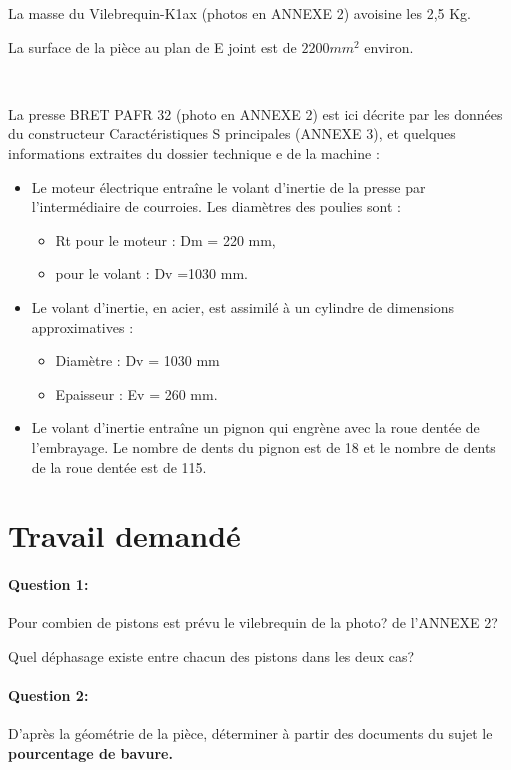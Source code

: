 La masse du \og Vilebrequin-K1ax \fg (photos en ANNEXE 2) avoisine les 2,5 Kg.

La surface de la pièce au plan de E joint est de $2200 mm^2$ environ.

~\

La presse \og BRET PAFR 32 \fg (photo en ANNEXE 2) est ici décrite par les données du constructeur \og Caractéristiques S principales \fg (ANNEXE 3), et quelques informations extraites du dossier technique e de la machine :
\begin{itemize}
 \item Le moteur électrique entraîne le volant d'inertie de la presse par l'intermédiaire de courroies. Les diamètres des poulies sont :
 \begin{itemize}
  \item Rt pour le moteur : Dm = 220 mm,
  \item pour le volant : Dv =1030 mm.
 \end{itemize}
 \item Le volant d'inertie, en acier, est assimilé à un cylindre de dimensions approximatives :
 \begin{itemize}
  \item Diamètre : Dv = 1030 mm
  \item Epaisseur : Ev = 260 mm.
 \end{itemize}
 \item Le volant d'inertie entraîne un pignon qui engrène avec la roue dentée de l'embrayage. Le nombre de dents du pignon est de 18 et le nombre de dents de la roue dentée est de 115.
\end{itemize}

\section{Travail demandé}

\paragraph{Question 1:} Pour combien de pistons est prévu le vilebrequin de la photo? de l'ANNEXE 2?

Quel déphasage existe entre chacun des pistons dans les deux cas?

\paragraph{Question 2:} D'après la géométrie de la pièce, déterminer à partir des documents du sujet le \textbf{pourcentage de bavure.}

